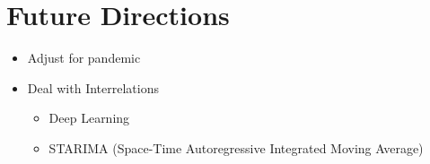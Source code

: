 \section{Future Directions}
\begin{frame}{\insertsectionhead}
\begin{itemize}
	\item<+-> Adjust for pandemic
	\item<+-> Deal with Interrelations
	\begin{itemize}
		\item<+-> Deep Learning
		\item<+-> STARIMA (Space-Time Autoregressive Integrated Moving Average)
	\end{itemize}
\end{itemize}
\end{frame}



